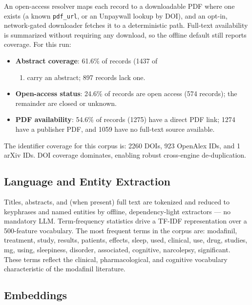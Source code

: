 \documentclass[
  english,
]{article}
\providecommand{\tightlist}{%
  \setlength{\itemsep}{0pt}\setlength{\parskip}{0pt}}
\begin{document}
An open-access resolver maps each record to a downloadable PDF where one
exists (a known \texttt{pdf\_url}, or an Unpaywall lookup by DOI), and
an opt-in, network-gated downloader fetches it to a deterministic path.
Full-text availability is summarized without requiring any download, so
the offline default still reports coverage. For this run:

\begin{itemize}
\tightlist
\item
  \textbf{Abstract coverage}: 61.6\% of records (1437 of

  \begin{enumerate}
  \def\labelenumi{\arabic{enumi})}
  \setcounter{enumi}{2333}
  \tightlist
  \item
    carry an abstract; 897 records lack one.
  \end{enumerate}
\item
  \textbf{Open-access status}: 24.6\% of records are open access (574
  records); the remainder are closed or unknown.
\item
  \textbf{PDF availability}: 54.6\% of records (1275) have a direct PDF
  link; 1274 have a publisher PDF, and 1059 have no full-text source
  available.
\end{itemize}

The identifier coverage for this corpus is: 2260 DOIs, 923 OpenAlex IDs,
and 1 arXiv IDs. DOI coverage dominates, enabling robust cross-engine
de-duplication.

\subsection{Language and Entity
Extraction}\label{language-and-entity-extraction}

Titles, abstracts, and (when present) full text are tokenized and
reduced to keyphrases and named entities by offline, dependency-light
extractors --- no mandatory LLM. Term-frequency statistics drive a
TF-IDF representation over a 500-feature vocabulary. The most frequent
terms in the corpus are: modafinil, treatment, study, results, patients,
effects, sleep, used, clinical, use, drug, studies, mg, using,
sleepiness, disorder, associated, cognitive, narcolepsy, significant.
These terms reflect the clinical, pharmacological, and cognitive
vocabulary characteristic of the modafinil literature.

\subsection{Embeddings}\label{embeddings}
\end{document}
